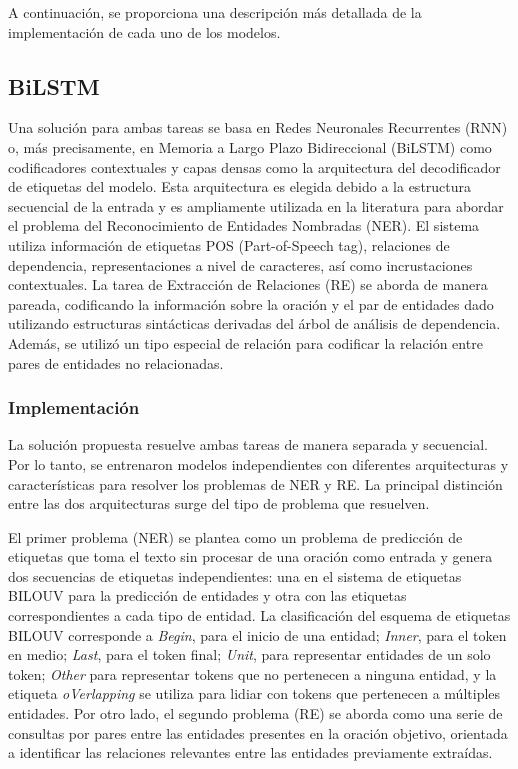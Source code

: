 \documentclass[10pt]{article} %
\begin{document}
	A continuación, se proporciona una descripción más detallada de la implementación de cada uno de los modelos.
	
	\subsection{BiLSTM} 
	Una solución para ambas tareas se basa en Redes Neuronales Recurrentes (RNN) o, más precisamente, en Memoria a Largo Plazo Bidireccional (BiLSTM) como codificadores contextuales y capas densas como la arquitectura del decodificador de etiquetas del modelo. Esta arquitectura es elegida debido a la estructura secuencial de la entrada y es ampliamente utilizada en la literatura \cite{bilstm1} para abordar el problema del Reconocimiento de Entidades Nombradas (NER). El sistema utiliza información de etiquetas POS (Part-of-Speech tag), relaciones de dependencia, representaciones a nivel de caracteres, así como incrustaciones contextuales. La tarea de Extracción de Relaciones (RE) se aborda de manera pareada, codificando la información sobre la oración y el par de entidades dado utilizando estructuras sintácticas derivadas del árbol de análisis de dependencia. Además, se utilizó un tipo especial de relación para codificar la relación entre pares de entidades no relacionadas.
	
	\subsubsection{Implementaci\'on} 
	La solución propuesta resuelve ambas tareas de manera separada y secuencial. Por lo tanto, se entrenaron modelos independientes con diferentes arquitecturas y características para resolver los problemas de NER y RE. La principal distinción entre las dos arquitecturas surge del tipo de problema que resuelven. 
	
	El primer problema (NER) se plantea como un problema de predicción de etiquetas que toma el texto sin procesar de una oración como entrada y genera dos secuencias de etiquetas independientes: una en el sistema de etiquetas BILOUV para la predicción de entidades y otra con las etiquetas correspondientes a cada tipo de entidad. La clasificación del esquema de etiquetas BILOUV corresponde a \textit{Begin}, para el inicio de una entidad; \textit{Inner}, para el token en medio; \textit{Last}, para el token final; \textit{Unit}, para representar entidades de un solo token; \textit{Other} para representar tokens que no pertenecen a ninguna entidad, y la etiqueta \textit{oVerlapping} se utiliza para lidiar con tokens que pertenecen a múltiples entidades. Por otro lado, el segundo problema (RE) se aborda como una serie de consultas por pares entre las entidades presentes en la oración objetivo, orientada a identificar las relaciones relevantes entre las entidades previamente extraídas. 
	
\end{document}
